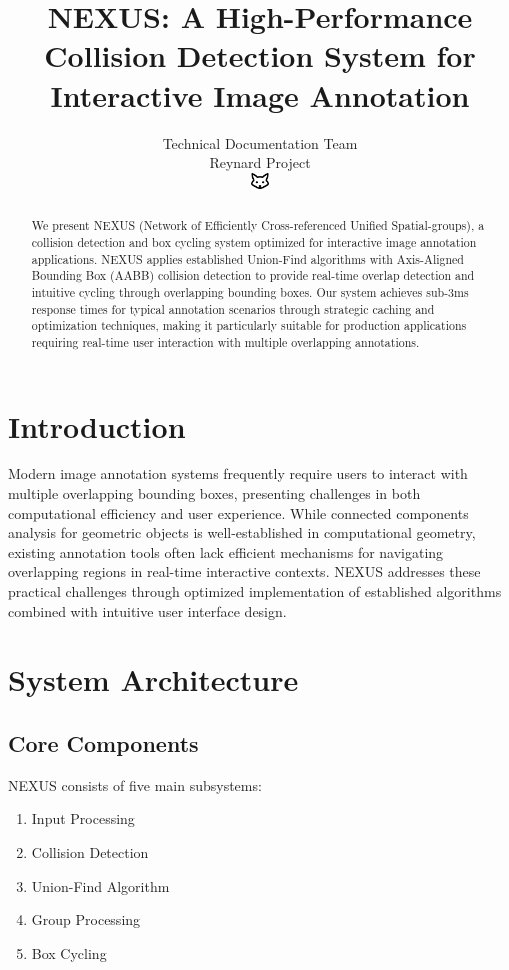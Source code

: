 \documentclass[10pt]{article}
\begin{document}
\title{NEXUS: A High-Performance Collision Detection System for Interactive Image Annotation}

\author{Technical Documentation Team\\
Reynard Project\\
\includegraphics[width=0.5cm]{../../shared-assets/favicon.pdf}}

\maketitle

\begin{abstract}
We present NEXUS (Network of Efficiently Cross-referenced Unified Spatial-groups), a collision detection and box cycling system optimized for interactive image annotation applications. NEXUS applies established Union-Find algorithms with Axis-Aligned Bounding Box (AABB) collision detection to provide real-time overlap detection and intuitive cycling through overlapping bounding boxes. Our system achieves sub-3ms response times for typical annotation scenarios through strategic caching and optimization techniques, making it particularly suitable for production applications requiring real-time user interaction with multiple overlapping annotations.
\end{abstract}

\section{Introduction}
Modern image annotation systems frequently require users to interact with multiple overlapping bounding boxes, presenting challenges in both computational efficiency and user experience. While connected components analysis for geometric objects is well-established in computational geometry, existing annotation tools often lack efficient mechanisms for navigating overlapping regions in real-time interactive contexts. NEXUS addresses these practical challenges through optimized implementation of established algorithms combined with intuitive user interface design.

\section{System Architecture}
\subsection{Core Components}
NEXUS consists of five main subsystems:
\begin{enumerate}
    \item Input Processing
    \item Collision Detection
    \item Union-Find Algorithm
    \item Group Processing
    \item Box Cycling
\end{enumerate}
\end{document}
